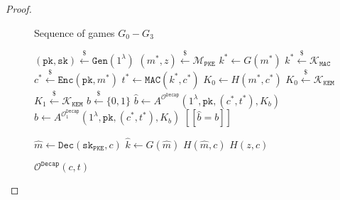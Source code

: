 \documentclass[floatrow,journal=tches,submission]{iacrtrans}
\newcommand{\monospace}{\texttt}
\newcommand{\pke}{\monospace{PKE}}
\newcommand{\keygen}{\monospace{Gen}}
\newcommand{\encrypt}{\monospace{Enc}}
\newcommand{\decrypt}{\monospace{Dec}}
\newcommand{\kem}{\monospace{KEM}}
\newcommand{\decap}{\monospace{Decap}}
\newcommand{\mac}{\monospace{MAC}}
\newcommand{\pk}{\monospace{pk}}
\newcommand{\sk}{\monospace{sk}}
\newcommand{\leftsample}{\stackrel{\$}{\leftarrow}}
\newcommand{\llbrack}{[\![}
\newcommand{\rrbrack}{]\!]}
\begin{document}
\begin{proof}
    \begin{figure}[H]
        \center
        \begin{minipage}{0.55\textwidth}
            \begin{algorithm}[H]
                \caption{Sequence of games $G_0 - G_3$}\label{alg:sequence-of-games}
                \begin{algorithmic}[1]
                    \State $(\pk, \sk) \leftsample \keygen(1^\lambda)$
                    \State $(m^\ast, z) \leftsample \mathcal{M}_\pke$
                    \State $k^\ast \leftarrow G(m^\ast)$
                    \State $k^\ast \leftsample \mathcal{K}_\mac$
                    \State $c^\ast \leftsample \encrypt(\pk, m^\ast)$
                    \State $t^\ast \leftarrow \mac(k^\ast, c^\ast)$
                    \State $K_0 \leftarrow H(m^\ast, c^\ast)$
                    \State $K_0 \leftsample \mathcal{K}_\kem$
                    \State $K_1 \leftsample \mathcal{K}_\kem$
                    \State $b \leftsample \{0,1\}$
                    \State $\hat{b} \leftarrow A^{\mathcal{O}^\decap}(
                        1^\lambda, \pk, (c^\ast, t^\ast), K_b)$
                    \State $\hat{b} \leftarrow A^{\mathcal{O}^\decap_1}(
                        1^\lambda, \pk, (c^\ast, t^\ast), K_b)$
                    \State \Return $\llbrack \hat{b} = b \rrbrack$
                \end{algorithmic}
            \end{algorithm}
        \end{minipage}
        \hfill
        \begin{minipage}{0.4\textwidth}
            \begin{algorithm}[H]
                \caption{$\mathcal{O}^\decap(c, t)$}\label{alg:etm-decap-oracle}
                \begin{algorithmic}[1]
                    \State $\hat{m} \leftarrow \decrypt(\sk_\pke, c)$
                    \State $\hat{k} \leftarrow G(\hat{m})$
                    \If{$\mac(\hat{k}, c) = t$}
                        \State \Return $H(\hat{m}, c)$
                    \EndIf
                    \State \Return $H(z, c)$
                \end{algorithmic}
            \end{algorithm}

\end{minipage}
\end{figure}
\end{proof}
\end{document}
